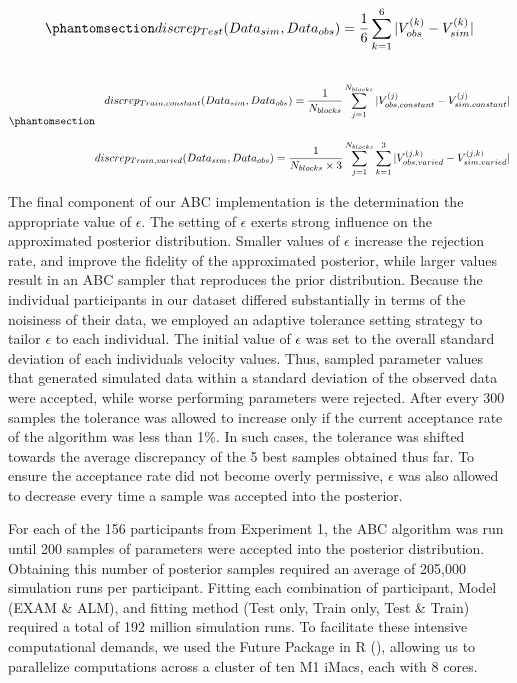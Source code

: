 \documentclass[
  letterpaper,
  DIV=11,
  numbers=noendperiod,
  oneside]{scrartcl}
\begin{document}
\begin{equation}\phantomsection\label{eq-discrep-test}{
discrep_{Test}(Data_{sim}, Data_{obs}) = \frac{1}{6} \sum_{k=1}^{6} |V_{obs}^{(k)} - V_{sim}^{(k)}|
}\end{equation}

\begin{equation}\phantomsection\label{eq-discrep-train}{
\begin{aligned} \\
discrep_{Train,constant}(Data_{sim}, Data_{obs}) = \frac{1}{N_{blocks}} \sum_{j=1}^{N_{blocks}} |V_{obs,constant}^{(j)} - V_{sim,constant}^{(j)}| \\ \\
discrep_{Train,varied}(Data_{sim}, Data_{obs}) = \frac{1}{N_{blocks} \times 3} \sum_{j=1}^{N_{blocks}} \sum_{k=1}^{3} |V_{obs,varied}^{(j,k)} - V_{sim,varied}^{(j,k)}|
\end{aligned}
}\end{equation}

The final component of our ABC implementation is the determination the
appropriate value of \(\epsilon\). The setting of \(\epsilon\) exerts
strong influence on the approximated posterior distribution. Smaller
values of \(\epsilon\) increase the rejection rate, and improve the
fidelity of the approximated posterior, while larger values result in an
ABC sampler that reproduces the prior distribution. Because the
individual participants in our dataset differed substantially in terms
of the noisiness of their data, we employed an adaptive tolerance
setting strategy to tailor \(\epsilon\) to each individual. The initial
value of \(\epsilon\) was set to the overall standard deviation of each
individuals velocity values. Thus, sampled parameter values that
generated simulated data within a standard deviation of the observed
data were accepted, while worse performing parameters were rejected.
After every 300 samples the tolerance was allowed to increase only if
the current acceptance rate of the algorithm was less than 1\%. In such
cases, the tolerance was shifted towards the average discrepancy of the
5 best samples obtained thus far. To ensure the acceptance rate did not
become overly permissive, \(\epsilon\) was also allowed to decrease
every time a sample was accepted into the posterior.

For each of the 156 participants from Experiment 1, the ABC algorithm
was run until 200 samples of parameters were accepted into the posterior
distribution. Obtaining this number of posterior samples required an
average of 205,000 simulation runs per participant. Fitting each
combination of participant, Model (EXAM \& ALM), and fitting method
(Test only, Train only, Test \& Train) required a total of 192 million
simulation runs. To facilitate these intensive computational demands, we
used the Future Package in R
(), allowing us to parallelize computations across a cluster of ten
M1 iMacs, each with 8 cores.
\end{document}
